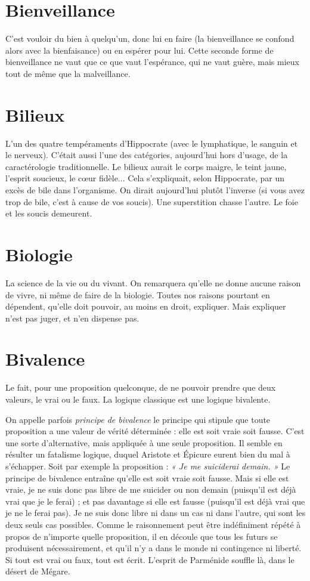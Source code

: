 \section{Bienveillance}
C'est vouloir du bien à quelqu'un, donc lui en faire (la
bienveillance se confond alors avec la bienfaisance) ou en
espérer pour lui. Cette seconde forme de bienveillance ne vaut que ce que vaut
l'espérance, qui ne vaut guère, mais mieux tout de même que la malveillance.

\section{Bilieux}
L'un des quatre tempéraments d’Hippocrate (avec le lymphatique,
le sanguin et le nerveux). C'était aussi l’une des catégories,
aujourd’hui hors d’usage, de la caractérologie traditionnelle. Le bilieux aurait le
corps maigre, le teint jaune, l'esprit soucieux, le cœur fidèle... Cela s’expliquait,
selon Hippocrate, par un excès de bile dans l'organisme. On dirait
aujourd’hui plutôt l'inverse (si vous avez trop de bile, c’est à cause de vos
soucis). Une superstition chasse l’autre. Le foie et les soucis demeurent.

\section{Biologie}
La science de la vie ou du vivant. On remarquera qu’elle ne
donne aucune raison de vivre, ni même de faire de la biologie.
Toutes nos raisons pourtant en dépendent, qu’elle doit pouvoir, au moins en
droit, expliquer. Mais expliquer n’est pas juger, et n’en dispense pas.

\section{Bivalence}
Le fait, pour une proposition quelconque, de ne pouvoir
prendre que deux valeurs, le vrai ou le faux. La logique classique
est une logique bivalente.

On appelle parfois {\it principe de bivalence} le principe qui stipule que toute
proposition a une valeur de vérité déterminée : elle est soit vraie soit fausse.
C’est une sorte d’alternative, mais appliquée à une seule proposition. Il semble
en résulter un fatalisme logique, duquel Aristote et Épicure eurent bien du mal
à s'échapper. Soit par exemple la proposition : {\it « Je me suiciderai demain. »} Le
principe de bivalence entraîne qu’elle est soit vraie soit fausse. Mais si elle est
vraie, je ne suis donc pas libre de me suicider ou non demain (puisqu'il est déjà
vrai que je le ferai) ; et pas davantage si elle est fausse (puisqu'il est déjà vrai que
je ne le ferai pas). Je ne suis donc libre ni dans un cas ni dans l’autre, qui sont
les deux seuls cas possibles. Comme le raisonnement peut être indéfiniment
répété à propos de n’importe quelle proposition, il en découle que tous les
futurs se produisent nécessairement, et qu’il n’y a dans le monde ni contingence
ni liberté. Si tout est vrai ou faux, tout est écrit. L'esprit de Parménide
souffle là, dans le désert de Mégare.

